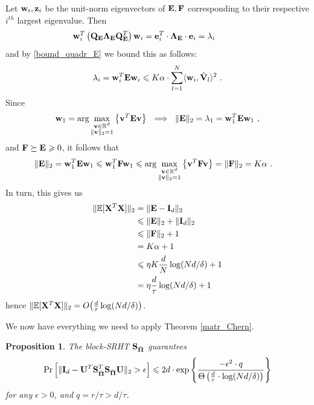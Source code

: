 \documentclass[journal,letterpaper,onecolumn,twoside,nofonttune]{IEEEtran}
\newcommand{\white}{\color{white}}
\newcommand{\Qb}{\bold{Q}}
\newcommand{\wb}{\bold{w}}
\newcommand{\Ub}{\bold{U}}
\newcommand{\vb}{\bold{v}}
\newcommand{\Xb}{\bold{X}}
\newcommand{\Fb}{\bold{F}}
\newcommand{\zb}{\bold{z}}
\newcommand{\Pibold}{\bold{\Pi}}
\newcommand{\Pibh}{\hat{\Pibold}}
\newcommand{\R}{\mathbb{R}}
\newcommand{\E}{\mathbb{E}}
\newcommand{\Sb}{\bold{S}}
\newcommand{\SbPh}{\Sb_{\Pibh}}
\newcommand{\Eb}{\bold{E}}
\newcommand{\eb}{\bold{e}}
\newcommand{\Ib}{\bold{I}}
\newcommand{\Vbh}{\hat{\bold{V}}}
\newtheorem{Prop}{Proposition}
\begin{document}
Let $\wb_i,\zb_i$ be the unit-norm eigenvectors of $\Eb,\Fb$ corresponding to their respective $i^{th}$ largest eigenvalue. Then
$$ \wb_i^T\left(\Qb_\Eb\bold{\Lambda}_\Eb\Qb_\Eb^T\right)\wb_i = \eb_i^T\cdot\bold{\Lambda}_\Eb\cdot\eb_i = \lambda_i \quad {\white\implies} $$
and by \eqref{bound_quadr_E} we bound this as follows:
\begin{align*}
  \lambda_i = \wb_i^T\Eb\wb_i \leqslant K\alpha\cdot\sum_{l=1}^N \langle \wb_i,\Vbh_l\rangle^2\ .
\end{align*}
Since
$$ \wb_1 = \arg\max_{\substack{\vb\in\R^d\\ \|\vb\|_2=1}}\big\{\vb^T\Eb\vb\big\} \ \implies \ \|\Eb\|_2 = \lambda_1=\wb_1^T\Eb\wb_1\ , $$
and $\Fb\succeq\Eb\geqslant0$, it follows that
\begin{align*}
  \|\Eb\|_2&=\wb_1^T\Eb\wb_1 \leqslant \wb_1^T\Fb\wb_1 \leqslant \arg\max_{\substack{\vb\in\R^d\\ \|\vb\|_2=1}}\big\{\vb^T\Fb\vb\big\} = \|\Fb\|_2 = K\alpha\ .
\end{align*}
In turn, this gives us 
\begin{align}
  \|\E[\Xb^T\Xb]\|_2 &= \|\Eb-\Ib_d\|_2\notag\\
  &\leqslant \|\Eb\|_2+\|\Ib_d\|_2\notag\\
  &\leqslant \|\Fb\|_2+1\notag\\
  &= K\alpha+1\notag\\
  &\leqslant \eta K\frac{d}{N}\log(Nd/\delta)+1 \notag\\
  &= \eta \frac{d}{\tau}\log(Nd/\delta)+1 \label{bound_var}
\end{align}
hence $\|\E[\Xb^T\Xb]\|_2=O\big(\frac{d}{\tau}\log(Nd/\delta)\big)$.

We now have everything we need to apply Theorem \ref{matr_Chern}.

\begin{Prop}
\label{prop_SRHT_b}
The block-SRHT $\SbPh$ guarantees %
$$ \Pr\Big[\|\bold{I}_d-\Ub^T\SbPh^T\SbPh\Ub\|_2>\epsilon\Big] \leqslant 2d\cdot \exp\left\{\frac{-\epsilon^2\cdot q}{\Theta\left(\frac{d}{\tau}\cdot\log(Nd/\delta)\right)}\right\} $$
for any $\epsilon>0$, and $q=r/\tau>d/\tau$.
\end{Prop}
\end{document}
